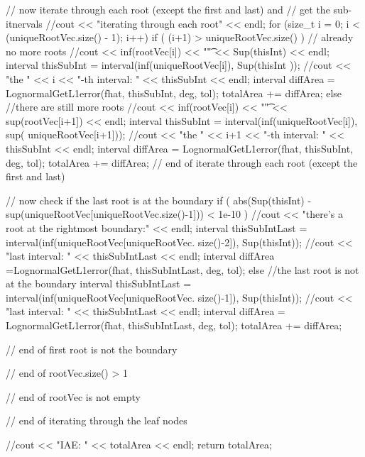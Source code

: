 \begin{DoxyCode}
{{{{{          // now iterate through each root (except the first and last) and 
          // get the sub-itnervals
          //cout << "iterating through each root" << endl;
          for (size_t i = 0; i < (uniqueRootVec.size() - 1); i++) {
            if ( (i+1) > uniqueRootVec.size() ) { // already no more roots
              //cout << inf(rootVec[i]) << "\t" << Sup(thisInt) << endl;
              interval thisSubInt = interval(inf(uniqueRootVec[i]), Sup(thisInt
      ));
              //cout << "the " << i << "-th interval: " << thisSubInt << endl;
              interval diffArea = LognormalGetL1error(fhat, thisSubInt, deg, 
      tol);
              totalArea += diffArea;
            }
            else { //there are still more roots
              //cout << inf(rootVec[i]) << "\t" << sup(rootVec[i+1]) << endl;
              interval thisSubInt = interval(inf(uniqueRootVec[i]), sup(
      uniqueRootVec[i+1]));
              //cout << "the " << i+1 << "-th interval: " << thisSubInt <<
       endl;
              interval diffArea = LognormalGetL1error(fhat, thisSubInt, deg, 
      tol);
              totalArea += diffArea;
            }
          } // end of iterate through each root (except the first and last)
          
          // now check if the last root is at the boundary
          if ( abs(Sup(thisInt) - sup(uniqueRootVec[uniqueRootVec.size()-1])) <
       1e-10 ) {
            //cout << "there's a root at the rightmost boundary:" << endl;
            interval thisSubIntLast = interval(inf(uniqueRootVec[uniqueRootVec.
      size()-2]), Sup(thisInt));
            //cout << "last interval: " << thisSubIntLast << endl; 
            interval diffArea =LognormalGetL1error(fhat, thisSubIntLast, deg, 
      tol);
          }
          else { //the last root is not at the boundary
            interval thisSubIntLast = interval(inf(uniqueRootVec[uniqueRootVec.
      size()-1]), Sup(thisInt));
            //cout << "last interval: " << thisSubIntLast << endl; 
            interval diffArea = LognormalGetL1error(fhat, thisSubIntLast, deg, 
      tol);
            totalArea += diffArea;
          } 
        } // end of first root is not the boundary
      } // end of rootVec.size() > 1
    } // end of rootVec is not empty

  } // end of iterating through the leaf nodes
  
  //cout << "IAE: " << totalArea << endl;
  return totalArea;
}
\end{DoxyCode}
